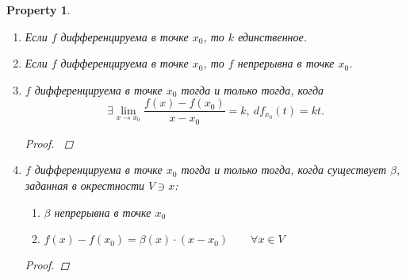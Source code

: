 \documentclass[11pt]{book}
\newcommand{\OO}{{\mathop{\text{\rm O}}}}
\theoremstyle{definition}
\theoremstyle{plain}
\theoremstyle{plain}
\newtheorem*{prop}{Property}
\theoremstyle{definition}
\theoremstyle{remark}
\begin{document}
\begin{prop}
    $ $
    \begin{enumerate}
        \item Если $ f$ дифференцируема в точке $ x_0$, то $ k$ единственное. 
	\item Если $ f$ дифференцируема в точке $ x_0$, то $ f$ непрерывна в точке $ x_0$.
	\item $ f$ дифференцируема в точке $ x_0$ тогда и только тогда, когда  \[
		\exists  \lim_{x \to  x_0} \frac{f(x) -f(x_0)}{x-x_0} = k, ~ df _{x_0} (t) = kt
	.\] 
	\begin{proof}
	     $ $
	\end{proof}
    \item $ f$ дифференцируема в точке $ x_0$ тогда и только тогда, когда существует $ \beta$, заданная в окрестности $ V \ni x$:
	\begin{enumerate}
	    \item $ \beta$ непрерывна в точке $ x_0$ 
	    \item $ f(x) - f(x_0) = \beta(x) \cdot (x-x_0) \qquad \forall  x \in V$
	\end{enumerate}
	\begin{proof}
	    \begin{description}
		\item \boxed{  \Longrightarrow } 
		    \[
			\beta(x)=
			\left[
			    \begin{array}{ll}
				\frac{f(x) - f(x_0)}{x-x_0} & x \ne x_0\\
				\lim_{y \to x_0}\frac{f(y)-f(x_0)}{y-x_0} & x = x_0 
			\end{array}
\right .
		    \] 
		\item \boxed{  \Longleftarrow } $ \beta(x) = \beta(x_0) + \OO_{x \to  x_0}(1)$
		    Подставим \[
			f(x) - \underbrace{\beta(x_0)}_{k}(x-x_0) + \OO_{x \to  x_0}(1)(x-x_0)
		    .\] 
		    Получили определение.
	    \end{description} 
	\end{proof}
    \end{enumerate}
\end{prop}
\end{document}
